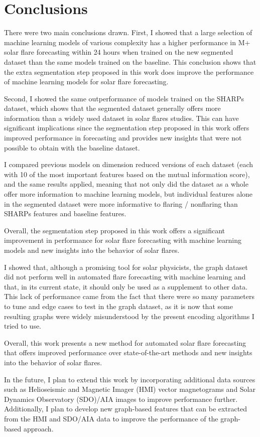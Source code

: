 \chapter{Conclusions}

There were two main conclusions drawn. First, I showed that a large selection of machine learning models of various complexity has a higher performance in M+ solar flare forecasting within 24 hours when trained on the new segmented dataset than the same models trained on the baseline. This conclusion shows that the extra segmentation step proposed in this work does improve the performance of machine learning models for solar flare forecasting. 

Second, I showed the same outperformance of models trained on the SHARPs dataset, which shows that the segmented dataset generally offers more information than a widely used dataset in solar flares studies. This can have significant implications since the segmentation step proposed in this work offers improved performance in forecasting and provides new insights that were not possible to obtain with the baseline dataset. 

I compared previous models on dimension reduced versions of each dataset (each with 10 of the most important features based on the mutual information score), and the same results applied, meaning that not only did the dataset as a whole offer more information to machine learning models, but individual features alone in the segmented dataset were more informative to flaring / nonflaring than SHARPs features and baseline features.  

Overall, the segmentation step proposed in this work offers a significant improvement in performance for solar flare forecasting with machine learning models and new insights into the behavior of solar flares. 

I showed that, although a promising tool for solar physicists, the graph dataset did not perform well in automated flare forecasting with machine learning and that, in its current state, it should only be used as a supplement to other data. This lack of performance came from the fact that there were so many parameters to tune and edge cases to test in the graph dataset, as it is now that some resulting graphs were widely misunderstood by the present encoding algorithms I tried to use.  

Overall,  this work presents a new method for automated solar flare forecasting that offers improved performance over state-of-the-art methods and new insights into the behavior of solar flares.

In the future,  I plan to extend this work by incorporating additional data sources such as Helioseismic and Magnetic Imager (HMI) vector magnetograms and Solar Dynamics Observatory (SDO)/AIA images to improve performance further. Additionally, I plan to develop new graph-based features that can be extracted from the HMI and SDO/AIA data to improve the performance of the graph-based approach. 